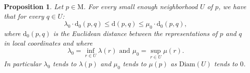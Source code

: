\documentclass[10pt,a4paper]{amsart}
\newtheorem{proposition}{Proposition}
\newcommand{\diam}{\mathrm{Diam}}
\newcommand{\dis}{\mathrm{d}}
\newcommand{\man}{\mathrm{M}}
\begin{document}
\begin{proposition}\label{prop:dis_equiv}Let $p\in\man$. For every small enough neighborhood $U$ of $p$, we have that for every $q\in U$:
$$\lambda_0\cdot\dis_0(p,q)\leq \dis(p,q)\leq\mu_0\cdot\dis_0(p,q),$$
where $\dis_0(p,q)$ is the Euclidean distance between the representations of $p$ and $q$ in local coordinates and where
$$\lambda_0=\inf_{r\in U}\lambda(r) \textrm{ and }
\mu_0=\sup_{r\in U}\mu(r).$$
In particular $\lambda_0$ tends to $ \lambda(p)$ and
$\mu_0$  tends to  $\mu(p)$ as $\diam(U)$ tends to $0$.
\end{proposition}
\end{document}
